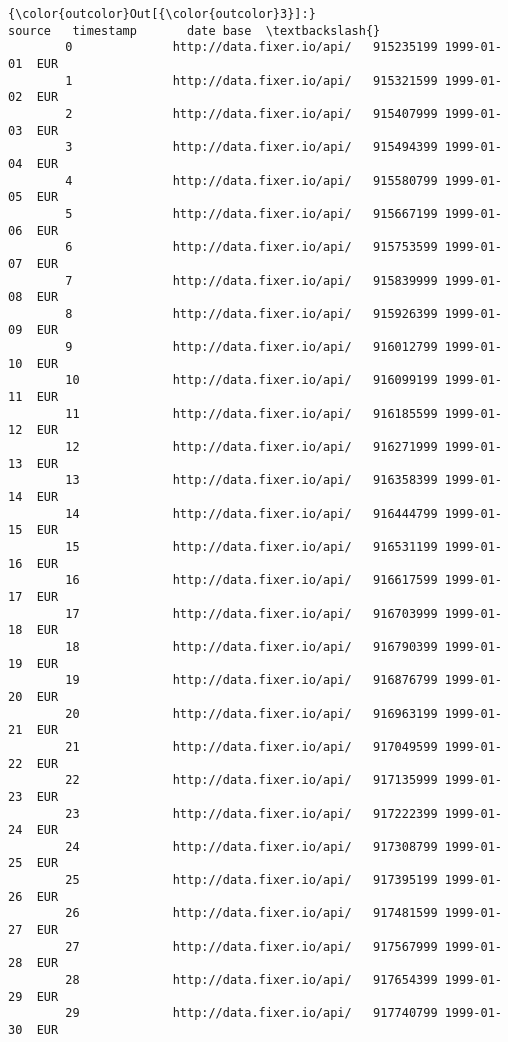 \documentclass[11pt]{article}
\begin{document}
\begin{Verbatim}[commandchars=\\\{\}]
{\color{outcolor}Out[{\color{outcolor}3}]:}                                   source   timestamp       date base  \textbackslash{}
        0              http://data.fixer.io/api/   915235199 1999-01-01  EUR   
        1              http://data.fixer.io/api/   915321599 1999-01-02  EUR   
        2              http://data.fixer.io/api/   915407999 1999-01-03  EUR   
        3              http://data.fixer.io/api/   915494399 1999-01-04  EUR   
        4              http://data.fixer.io/api/   915580799 1999-01-05  EUR   
        5              http://data.fixer.io/api/   915667199 1999-01-06  EUR   
        6              http://data.fixer.io/api/   915753599 1999-01-07  EUR   
        7              http://data.fixer.io/api/   915839999 1999-01-08  EUR   
        8              http://data.fixer.io/api/   915926399 1999-01-09  EUR   
        9              http://data.fixer.io/api/   916012799 1999-01-10  EUR   
        10             http://data.fixer.io/api/   916099199 1999-01-11  EUR   
        11             http://data.fixer.io/api/   916185599 1999-01-12  EUR   
        12             http://data.fixer.io/api/   916271999 1999-01-13  EUR   
        13             http://data.fixer.io/api/   916358399 1999-01-14  EUR   
        14             http://data.fixer.io/api/   916444799 1999-01-15  EUR   
        15             http://data.fixer.io/api/   916531199 1999-01-16  EUR   
        16             http://data.fixer.io/api/   916617599 1999-01-17  EUR   
        17             http://data.fixer.io/api/   916703999 1999-01-18  EUR   
        18             http://data.fixer.io/api/   916790399 1999-01-19  EUR   
        19             http://data.fixer.io/api/   916876799 1999-01-20  EUR   
        20             http://data.fixer.io/api/   916963199 1999-01-21  EUR   
        21             http://data.fixer.io/api/   917049599 1999-01-22  EUR   
        22             http://data.fixer.io/api/   917135999 1999-01-23  EUR   
        23             http://data.fixer.io/api/   917222399 1999-01-24  EUR   
        24             http://data.fixer.io/api/   917308799 1999-01-25  EUR   
        25             http://data.fixer.io/api/   917395199 1999-01-26  EUR   
        26             http://data.fixer.io/api/   917481599 1999-01-27  EUR   
        27             http://data.fixer.io/api/   917567999 1999-01-28  EUR   
        28             http://data.fixer.io/api/   917654399 1999-01-29  EUR   
        29             http://data.fixer.io/api/   917740799 1999-01-30  EUR   

\end{Verbatim}
\end{document}

